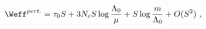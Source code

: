 \begin{equation}
\label{eq:Wpert}
\Weff^{pert.}=\tau_0 S + 3N_cS\log{\frac{\Lambda_0}{\mu}}+
S\log{\frac{m}{\Lambda_0}}+O(S^2) ~,
\end{equation}

